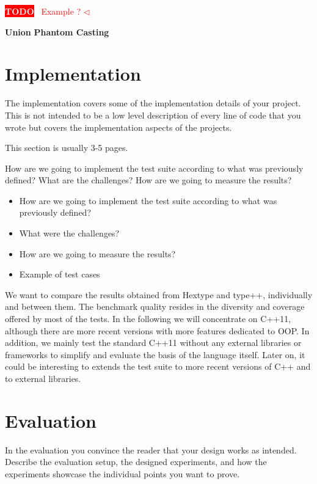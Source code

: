 \documentclass[a4paper,11pt,oneside]{report}
\newcommand{\todobox}[3]{%
       \colorbox{#1}{\textcolor{white}{\sffamily\bfseries\scriptsize #2}}%
       ~\textcolor{#1}{#3} %
       \textcolor{#1}{$\triangleleft$}%
}
\newcommand{\adrbqt}[1]{\todobox{red}{TODO}{#1}}
\begin{document}
\adrbqt{Example ?}
\textbf{Union}
\textbf{Phantom Casting}



\chapter{Implementation}

The implementation covers some of the implementation details of your project.
This is not intended to be a low level description of every line of code that
you wrote but covers the implementation aspects of the projects.

This section is usually 3-5 pages.

How are we going to implement the test suite according to what was previously defined? What are the challenges? 
How are we going to measure the results?

\begin{itemize}
       \item How are we going to implement the test suite according to what was previously defined? 
       \item What were the challenges?
       \item How are we going to measure the results?
       \item Example of test cases
\end{itemize}

We want to compare the results obtained from Hextype and type++, individually and between them. The benchmark quality resides 
in the diversity and coverage offered by most of the tests. In the following we will concentrate on C++11,
although there are more recent versions with more features dedicated to OOP. In addition, we mainly test the standard
C++11 without any external libraries or frameworks to simplify and evaluate the basis of the language itself. Later on,
it could be interesting to extends the test suite to more recent versions of C++ and to external libraries. 


\chapter{Evaluation}

In the evaluation you convince the reader that your design works as intended.
Describe the evaluation setup, the designed experiments, and how the
experiments showcase the individual points you want to prove.
\end{document}
